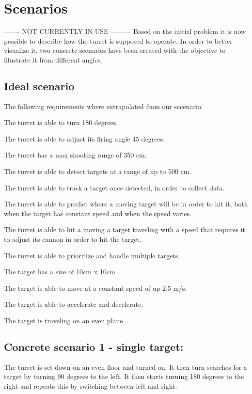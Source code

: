 \section{Scenarios}
------- NOT CURRENTLY IN USE ---------
Based on the initial problem it is now possible to describe how the turret is
supposed to operate. In order to better visualize it, two concrete scenarios
have been created with the objective to illustrate it from different angles.

\subsection{Ideal scenario}

The following requirements where extrapolated from our sccenario:\nl

The turret is able to turn 180 degrees.\nl

The turret is able to adjust its firing angle 45 degrees.\nl
 
The turret has a max shooting range of 350 cm.\nl

The turret is able to detect targets at a range of up to 500 cm.\nl

The turret is able to track a target once detected, in order to collect data.\nl

The turret is able to predict where a moving target will be in order to hit it,
both when the target has constant speed and when the speed varies.\nl

The turret is able to hit a moving a target traveling with a speed that
requires it to adjust its cannon in order to hit the target.\nl

The turret is able to prioritize and handle multiple targets.\nl

The target has a size of 10cm x 10cm.\nl

The target is able to move at a constant speed of up 2.5 m/s.\nl

The target is able to accelerate and decelerate.\nl

The target is traveling on an even plane.\nl



\subsection{Concrete scenario 1 - single target:}
The turret is set down on an even floor and turned on. It then turn searches
for a target by turning 90 degrees to the left. It then starts turning 180
degrees to the right and repeats this by switching between left and right.\nl

